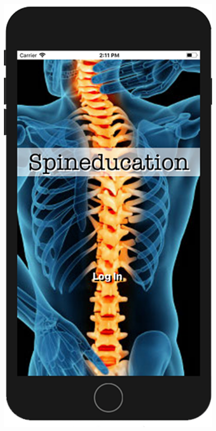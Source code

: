 \documentclass[final]{beamer}
\newlength{\onecolwid}
\begin{document}
\begin{frame}[t]
\begin{columns}[t]
\begin{column}{\onecolwid}
\begin{figure}
\includegraphics[width=30cm,height=50cm,keepaspectratio]{homescreen.png}
\end{figure}


\end{column}
\end{columns}
\end{frame}
\end{document}
